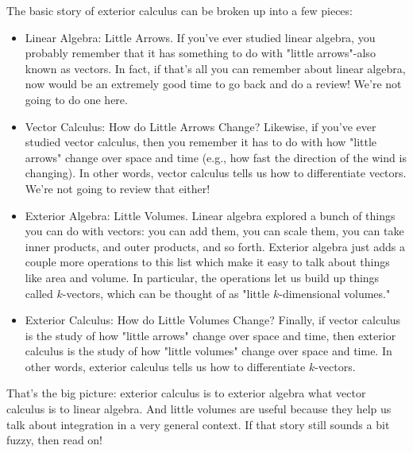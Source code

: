 \documentclass[10pt]{article}
\begin{document}
The basic story of exterior calculus can be broken up into a few pieces:

\begin{itemize}
  \item[-] Linear Algebra: Little Arrows. If you've ever studied linear algebra, you probably remember that it has something to do with "little arrows"-also known as vectors. In fact, if that's all you can remember about linear algebra, now would be an extremely good time to go back and do a review! We're not going to do one here.
  \item[-] Vector Calculus: How do Little Arrows Change? Likewise, if you've ever studied vector calculus, then you remember it has to do with how "little arrows" change over space and time (e.g., how fast the direction of the wind is changing). In other words, vector calculus tells us how to differentiate vectors. We're not going to review that either!
  \item[-] Exterior Algebra: Little Volumes. Linear algebra explored a bunch of things you can do with vectors: you can add them, you can scale them, you can take inner products, and outer products, and so forth. Exterior algebra just adds a couple more operations to this list which make it easy to talk about things like area and volume. In particular, the operations let us build up things called $k$-vectors, which can be thought of as "little $k$-dimensional volumes."
  \item[-] Exterior Calculus: How do Little Volumes Change? Finally, if vector calculus is the study of how "little arrows" change over space and time, then exterior calculus is the study of how "little volumes" change over space and time. In other words, exterior calculus tells us how to differentiate $k$-vectors.
\end{itemize}

That's the big picture: exterior calculus is to exterior algebra what vector calculus is to linear algebra. And little volumes are useful because they help us talk about integration in a very general context. If that story still sounds a bit fuzzy, then read on!
\end{document}
